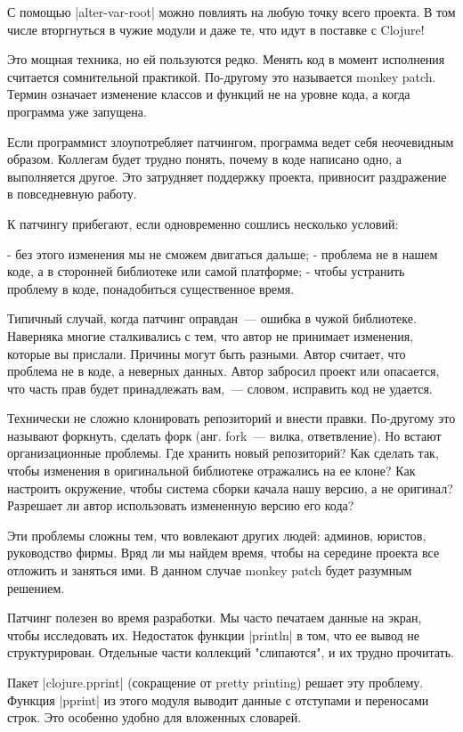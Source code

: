 С помощью \spverb|alter-var-root| можно повлиять на любую точку всего проекта. В том
числе вторгнуться в чужие модули и даже те, что идут в поставке с Clojure!

Это мощная техника, но ей пользуются редко. Менять код в момент исполнения
считается сомнительной практикой. По-другому это называется monkey patch. Термин
означает изменение классов и функций не на уровне кода, а когда программа уже
запущена.

Если программист злоупотребляет патчингом, программа ведет себя неочевидным
образом. Коллегам будет трудно понять, почему в коде написано одно, а
выполняется другое. Это затрудняет поддержку проекта, привносит раздражение в
повседневную работу.

К патчингу прибегают, если одновременно сошлись несколько условий:

- без этого изменения мы не сможем двигаться дальше;
- проблема не в нашем коде, а в сторонней библиотеке или самой платформе;
- чтобы устранить проблему в коде, понадобиться существенное время.

Типичный случай, когда патчинг оправдан~--- ошибка в чужой библиотеке. Наверняка
многие сталкивались с тем, что автор не принимает изменения, которые вы
прислали. Причины могут быть разными. Автор считает, что проблема не в коде, а
неверных данных. Автор забросил проект или опасается, что часть прав будет
принадлежать вам,~--- словом, исправить код не удается.

Технически не сложно клонировать репозиторий и внести правки. По-другому это
называют форкнуть, сделать форк (анг. fork~--- вилка, ответвление). Но встают
организационные проблемы. Где хранить новый репозиторий? Как сделать так, чтобы
изменения в оригинальной библиотеке отражались на ее клоне? Как настроить
окружение, чтобы система сборки качала нашу версию, а не оригинал? Разрешает ли
автор использовать измененную версию его кода?

Эти проблемы сложны тем, что вовлекают других людей: админов, юристов,
руководство фирмы. Вряд ли мы найдем время, чтобы на середине проекта все
отложить и заняться ими. В данном случае monkey patch будет разумным решением.

Патчинг полезен во время разработки. Мы часто печатаем данные на экран, чтобы
исследовать их. Недостаток функции \spverb|println| в том, что ее вывод не
структурирован. Отдельные части коллекций "слипаются", и их трудно прочитать.

Пакет \spverb|clojure.pprint| (сокращение от pretty printing) решает эту
проблему. Функция \spverb|pprint| из этого модуля выводит данные с отступами и
переносами строк. Это особенно удобно для вложенных словарей.

